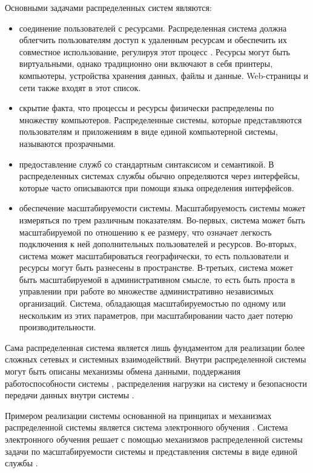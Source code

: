 Основными задачами распределенных систем являются:

\begin{itemize}
\item соединение пользователей с ресурсами. Распределенная система должна облегчить пользователям доступ к удаленным ресурсам и обеспечить их совместное использование, регулируя этот процесс \cite{ghosh2014distributed}. Ресурсы могут быть виртуальными, однако традиционно они включают в себя принтеры, компьютеры, устройства хранения данных, файлы и данные. Web-страницы и сети также входят в этот список. 
\item скрытие факта, что процессы и ресурсы физически распределены по множеству компьютеров. Распределенные системы, которые представляются пользователям и приложениям в виде единой компьютерной системы, называются прозрачными.
\item предоставление служб со стандартным синтаксисом и семантикой. В распределенных системах службы обычно определяются через интерфейсы, которые часто описываются при помощи языка определения интерфейсов.
\item обеспечение масштабируемости системы. Масштабируемость системы может измеряться по трем различным показателям. Во-первых, система может быть масштабируемой по отношению к ее размеру, что означает легкость подключения к ней дополнительных пользователей и ресурсов. Во-вторых, система может масштабироваться географически, то есть пользователи и ресурсы могут быть разнесены в пространстве. В-третьих, система может быть масштабируемой в административном смысле, то есть быть проста в управлении при работе во множестве административно независимых организаций. Система, обладающая масштабируемостью по одному или нескольким из этих параметров, при масштабировании часто дает потерю производительности.
\end{itemize}

Сама распределенная система является лишь фундаментом для реализации более сложных сетевых и системных взаимодействий. Внутри распределенной системы могут быть описаны механизмы обмена данными, поддержания работоспособности системы \cite{jalote1994fault}, распределения нагрузки на систему \cite{shirazi1995scheduling} и безопасности передачи данных внутри системы \cite{chen2011parallel}. 

Примером реализации системы основанной на принципах и механизмах распределенной системы является система электронного обучения \cite{masud2012learning}. Система электронного обучения решает с помощью механизмов распределенной системы задачи по масштабируемости системы и представления системы в виде единой службы \cite{masud2012novel}. 



